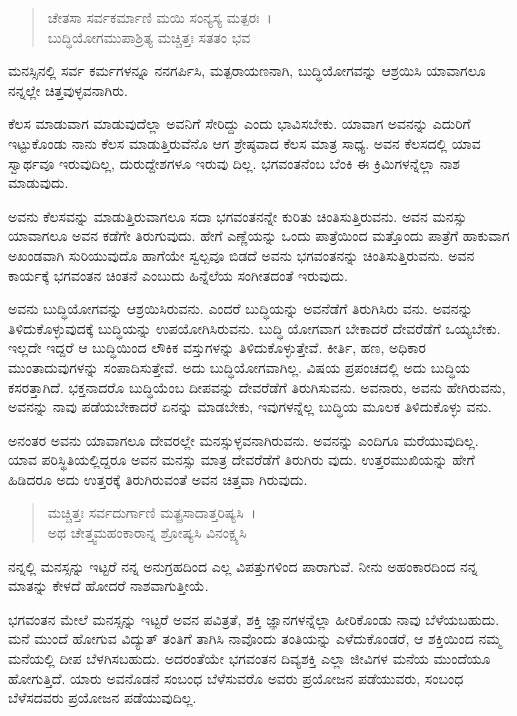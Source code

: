 \begin{verse}
ಚೇತಸಾ ಸರ್ವಕರ್ಮಾಣಿ ಮಯಿ ಸಂನ್ಯಸ್ಯ ಮತ್ಪರಃ~।\\ಬುದ್ಧಿಯೋಗಮುಪಾಶ್ರಿತ್ಯ ಮಚ್ಚಿತ್ತಃ ಸತತಂ ಭವ 
\end{verse}

{\small ಮನಸ್ಸಿನಲ್ಲಿ ಸರ್ವ ಕರ್ಮಗಳನ್ನೂ ನನಗರ್ಪಿಸಿ, ಮತ್ಪರಾಯಣನಾಗಿ, ಬುದ್ಧಿಯೋಗವನ್ನು ಆಶ್ರಯಿಸಿ ಯಾವಾಗಲೂ ನನ್ನಲ್ಲೇ ಚಿತ್ತವುಳ್ಳವನಾಗಿರು.}

ಕೆಲಸ ಮಾಡುವಾಗ ಮಾಡುವುದೆಲ್ಲಾ ಅವನಿಗೆ ಸೇರಿದ್ದು ಎಂದು ಭಾವಿಸಬೇಕು. ಯಾವಾಗ ಅವನನ್ನು ಎದುರಿಗೆ ಇಟ್ಟುಕೊಂಡು ನಾನು ಕೆಲಸ ಮಾಡುತ್ತಿರುವೆನೊ ಆಗ ಶ್ರೇಷ್ಠವಾದ ಕೆಲಸ ಮಾತ್ರ ಸಾಧ್ಯ. ಅವನ ಕೆಲಸದಲ್ಲಿ ಯಾವ ಸ್ವಾರ್ಥವೂ ಇರುವುದಿಲ್ಲ, ದುರುದ್ದೇಶಗಳೂ ಇರುವು ದಿಲ್ಲ. ಭಗವಂತನೆಂಬ ಬೆಂಕಿ ಈ ಕ್ರಿಮಿಗಳನ್ನೆಲ್ಲಾ ನಾಶ ಮಾಡುವುದು.

ಅವನು ಕೆಲಸವನ್ನು ಮಾಡುತ್ತಿರುವಾಗಲೂ ಸದಾ ಭಗವಂತನನ್ನೇ ಕುರಿತು ಚಿಂತಿಸುತ್ತಿರುವನು. ಅವನ ಮನಸ್ಸು ಯಾವಾಗಲೂ ಅವನ ಕಡೆಗೇ ತಿರುಗುವುದು. ಹೇಗೆ ಎಣ್ಣೆಯನ್ನು ಒಂದು ಪಾತ್ರೆಯಿಂದ ಮತ್ತೊಂದು ಪಾತ್ರೆಗೆ ಹಾಕುವಾಗ ಅಖಂಡವಾಗಿ ಸುರಿಯುವುದೊ ಹಾಗೆಯೇ ಸ್ವಲ್ಪವೂ ಬಿಡದೆ ಅವನು ಭಗವಂತನನ್ನು ಚಿಂತಿಸುತ್ತಿರುವನು. ಅವನ ಕಾರ್ಯಕ್ಕೆ ಭಗವಂತನ ಚಿಂತನೆ ಎಂಬುದು ಹಿನ್ನೆಲೆಯ ಸಂಗೀತದಂತೆ ಇರುವುದು.

ಅವನು ಬುದ್ಧಿಯೋಗವನ್ನು ಆಶ್ರಯಿಸಿರುವನು. ಎಂದರೆ ಬುದ್ಧಿಯನ್ನು ಅವನೆಡೆಗೆ ತಿರುಗಿಸಿರು ವನು. ಅವನನ್ನು ತಿಳಿದುಕೊಳ್ಳುವುದಕ್ಕೆ ಬುದ್ಧಿಯನ್ನು ಉಪಯೋಗಿಸಿರುವನು. ಬುದ್ಧಿ ಯೋಗವಾಗ ಬೇಕಾದರೆ ದೇವರೆಡೆಗೆ ಒಯ್ಯಬೇಕು. ಇಲ್ಲದೇ ಇದ್ದರೆ ಆ ಬುದ್ಧಿಯಿಂದ ಲೌಕಿಕ ವಸ್ತುಗಳನ್ನು ತಿಳಿದುಕೊಳ್ಳುತ್ತೇವೆ. ಕೀರ್ತಿ, ಹಣ, ಅಧಿಕಾರ ಮುಂತಾದುವುಗಳನ್ನು ಸಂಪಾದಿಸುತ್ತೇವೆ. ಅದು ಬುದ್ಧಿಯೋಗವಾಗಿಲ್ಲ. ವಿಷಯ ಪ್ರಪಂಚದಲ್ಲಿ ಅದು ಬುದ್ಧಿಯ ಕಸರತ್ತಾಗಿದೆ. ಭಕ್ತನಾದರೊ ಬುದ್ಧಿಯೆಂಬ ದೀಪವನ್ನು ದೇವರೆಡೆಗೆ ತಿರುಗಿಸುವನು. ಅವನಾರು, ಅವನು ಹೇಗಿರುವನು, ಅವನನ್ನು ನಾವು ಪಡೆಯಬೇಕಾದರೆ ಏನನ್ನು ಮಾಡಬೇಕು, ಇವುಗಳನ್ನೆಲ್ಲ ಬುದ್ಧಿಯ ಮೂಲಕ ತಿಳಿದುಕೊಳ್ಳು ವನು.

ಅನಂತರ ಅವನು ಯಾವಾಗಲೂ ದೇವರಲ್ಲೇ ಮನಸ್ಸುಳ್ಳವನಾಗಿರುವನು. ಅವನನ್ನು ಎಂದಿಗೂ ಮರೆಯುವುದಿಲ್ಲ. ಯಾವ ಪರಿಸ್ಥಿತಿಯಲ್ಲಿದ್ದರೂ ಅವನ ಮನಸ್ಸು ಮಾತ್ರ ದೇವರೆಡೆಗೆ ತಿರುಗಿರು ವುದು. ಉತ್ತರಮುಖಿಯನ್ನು ಹೇಗೆ ಹಿಡಿದರೂ ಅದು ಉತ್ತರಕ್ಕೆ ತಿರುಗಿರುವಂತೆ ಅವನ ಚಿತ್ತವಾ ಗಿರುವುದು.

\begin{verse}
ಮಚ್ಚಿತ್ತಃ ಸರ್ವದುರ್ಗಾಣಿ ಮತ್ಪ್ರಸಾದಾತ್ತರಿಷ್ಯಸಿ~।\\ಅಥ ಚೇತ್ತ್ವಮಹಂಕಾರಾನ್ನ ಶ್ರೋಷ್ಯಸಿ ವಿನಂಕ್ಷ್ಯಸಿ 
\end{verse}

{\small ನನ್ನಲ್ಲಿ ಮನಸ್ಸನ್ನು ಇಟ್ಟರೆ ನನ್ನ ಅನುಗ್ರಹದಿಂದ ಎಲ್ಲ ವಿಪತ್ತುಗಳಿಂದ ಪಾರಾಗುವೆ. ನೀನು ಅಹಂಕಾರದಿಂದ ನನ್ನ ಮಾತನ್ನು ಕೇಳದೆ ಹೋದರೆ ನಾಶವಾಗುತ್ತೀಯೆ.}

ಭಗವಂತನ ಮೇಲೆ ಮನಸ್ಸನ್ನು ಇಟ್ಟರೆ ಅವನ ಪವಿತ್ರತೆ, ಶಕ್ತಿ ಜ್ಞಾನಗಳನ್ನೆಲ್ಲಾ ಹೀರಿಕೊಂಡು ನಾವು ಬೆಳೆಯಬಹುದು. ಮನೆ ಮುಂದೆ ಹೋಗುವ ವಿದ್ಯುತ್ ತಂತಿಗೆ ತಾಗಿಸಿ ನಾವೊಂದು ತಂತಿಯನ್ನು ಎಳೆದುಕೊಂಡರೆ, ಆ ಶಕ್ತಿಯಿಂದ ನಮ್ಮ ಮನೆಯಲ್ಲಿ ದೀಪ ಬೆಳಗಿಸಬಹುದು. ಅದರಂತೆಯೇ ಭಗವಂತನ ದಿವ್ಯಶಕ್ತಿ ಎಲ್ಲಾ ಜೀವಿಗಳ ಮನೆಯ ಮುಂದೆಯೂ ಹೋಗುತ್ತಿದೆ. ಯಾರು ಅವನೊಡನೆ ಸಂಬಂಧ ಬೆಳೆಸುವರೊ ಅವರು ಪ್ರಯೋಜನ ಪಡೆಯುವರು, ಸಂಬಂಧ ಬೆಳೆಸದವರು ಪ್ರಯೋಜನ ಪಡೆಯುವುದಿಲ್ಲ.

